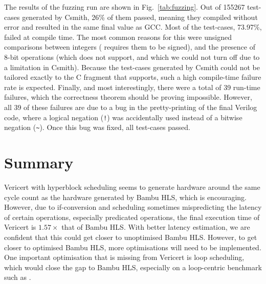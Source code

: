 The results of the fuzzing run are shown in Fig.~\ref{tab:fuzzing}.  Out of
155267 test-cases generated by Csmith, 26\% of them passed, meaning they
compiled without error and resulted in the same final value as GCC. Most of the
test-cases, 73.97\%, failed at compile time.  The most common reasons for this
were unsigned comparisons between integers (\vericert{} requires them to be
signed), and the presence of 8-bit operations (which \vericert{} does not
support, and which we could not turn off due to a limitation in Csmith).
Because the test-cases generated by Csmith could not be tailored exactly to the
C fragment that \vericert{} supports, such a high compile-time failure rate is
expected. Finally, and most interestingly, there were a total of 39 run-time
failures, which the correctness theorem should be proving impossible.  However,
all 39 of these failures are due to a bug in the pretty-printing of the final
Verilog code, where a logical negation (\texttt{!}) was accidentally used
instead of a bitwise negation (\verb|~|).  Once this bug was fixed, all
test-cases passed.

\section{Summary}

Vericert with hyperblock scheduling seems to generate hardware around the same
cycle count as the hardware generated by Bambu HLS, which is encouraging.
However, due to if-conversion and scheduling sometimes mispredicting the latency
of certain operations, especially predicated operations, the final execution
time of Vericert is $1.57\times$ that of Bambu HLS.  With better latency
estimation, we are confident that this could get closer to unoptimised Bambu
HLS.  However, to get closer to optimised Bambu HLS, more optimisations will
need to be implemented.  One important optimisation that is missing from
Vericert is loop scheduling, which would close the gap to Bambu HLS, especially
on a loop-centric benchmark such as \polybench{}.


